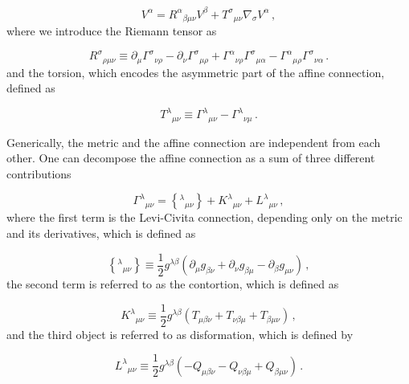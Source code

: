 \begin{equation}
    [\nabla_\mu, \nabla_\nu] V^\alpha = R^\alpha{}_{\beta \mu \nu} V^\beta + T^\sigma{}_{\mu \nu} \nabla_\sigma V^\alpha \,,
\end{equation}
where we introduce the Riemann tensor as

\begin{equation}
    \label{eq:riemann}
    R^{\sigma}{}_{\rho\mu\nu} \equiv
    \partial_{\mu} \Gamma^{\sigma}{}_{\nu\rho} - \partial_{\nu} \Gamma^{\sigma}{}_{\mu\rho} + \Gamma^{\alpha}{}_{\nu\rho} \Gamma^{\sigma}{}_{\mu\alpha} -
    \Gamma^{\alpha}{}_{\mu\rho} \Gamma^{\sigma}{}_{\nu\alpha} \,.
\end{equation}
and the torsion, which encodes the asymmetric part of the affine connection, defined as

\begin{equation}
    T^\lambda{}_{\mu \nu} \equiv \Gamma^\lambda{}_{\mu \nu} - \Gamma^\lambda{}_{\nu \mu} \,.
\end{equation}

Generically, the metric and the affine connection are independent from each other. One can decompose the affine connection as a sum of three different contributions \cite{GeneralizationsGR-R2018}

\begin{equation}
    \label{eq:affine-connection}
    \Gamma^{\lambda}{}_{\mu\nu} =
    \left\lbrace {}^{\lambda}{}_{\mu\nu} \right\rbrace +
    K^{\lambda}{}_{\mu\nu} +
    L^{\lambda}{}_{\mu\nu} \,,
\end{equation}
where the first term is the Levi-Civita connection, depending only on the metric and its derivatives, which is defined as

\begin{equation}
    \left\lbrace {}^{\lambda}{}_{\mu \nu} \right\rbrace \equiv
    \frac{1}{2} g^{\lambda \beta}
    \left( \partial_{\mu} g_{\beta\nu} + \partial_{\nu} g_{\beta\mu} -
    \partial_{\beta} g_{\mu\nu} \right) \,,
\end{equation}
the second term is referred to as the contortion, which is defined as

\begin{equation}
    K^{\lambda}{}_{\mu\nu} \equiv \frac{1}{2} g^{\lambda \beta}
    \left( T_{\mu\beta\nu} + T_{\nu\beta\mu} + T_{\beta\mu\nu} \right) \,,
\end{equation}
and the third object is referred to as disformation, which is defined by

\begin{equation}
    L^{\lambda}{}_{\mu\nu} \equiv \frac{1}{2} g^{\lambda \beta}
    \left( -Q_{\mu \beta\nu}-Q_{\nu \beta\mu}+Q_{\beta \mu \nu} \right) \,.
\end{equation}

